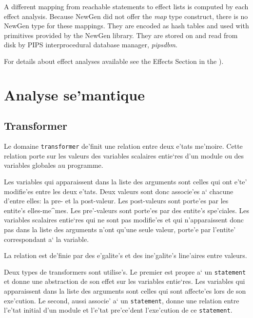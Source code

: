 {A different mapping from reachable statements to effect lists is
computed by each effect analysis. Because NewGen did not offer the {\em
map} type construct, there is no NewGen type for these mappings. They
are encoded as hash tables and used with primitives provided by the
NewGen library. They are stored on and read from disk by PIPS
interprocedural database manager, {\em pipsdbm}.

For details about effect analyses available see the Effects Section in the
).

\section{Analyse se'mantique}
\label{semantics}

\subsection{Transformer}
\label{subsection-transformer}

{}

Le domaine {\tt transformer} de'finit une relation entre deux e'tats
me'moire. Cette relation
porte sur les valeurs des variables scalaires entie`res d'un module ou
des variables globales au programme.

Les variables qui apparaissent dans la liste des arguments sont celles
qui ont e'te' modifie'es entre les deux e'tats. Deux valeurs
sont donc associe'es a` chacune d'entre elles: la pre- et la
post-valeur.  Les post-valeurs sont porte'es par les entite's
elles-me^mes. Les pre'-valeurs sont porte'es par des entite's
spe'ciales. Les variables scalaires entie`res qui ne sont pas modifie'es
et qui n'apparaissent donc pas dans la liste des arguments n'ont qu'une
seule valeur, porte'e par l'entite' correspondant a` la variable.

La relation est de'finie par des e'galite's et des ine'galite's
line'aires entre valeurs.

Deux types de transformers sont utilise's. Le premier est propre a` un
{\tt statement} et donne une abstraction de son effet sur les variables
entie`res. Les variables qui apparaissent dans la liste des arguments
sont celles qui sont affecte'es lors de son exe'cution.  Le second,
aussi associe' a` un {\tt statement}, donne une relation entre l'e'tat
initial d'un module et l'e'tat pre'ce'dent l'exe'cution de ce {\tt statement}.

}
